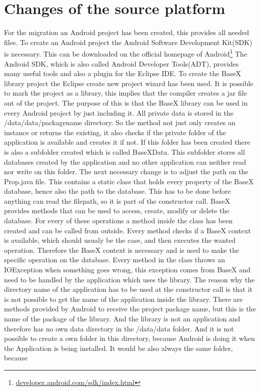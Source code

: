\section{Changes of the source platform}
\label{sec:migration:changes-of-the-source-platform}
For the migration an Android project has been created, this provides all needed files.
To create an Android project the Android Software Development Kit(SDK) is necessary.
This can be downloaded on the official homepage of Android\footnote{\url{developer.android.com/sdk/index.html}}
The Android SDK, which is also called Android Developer Tools(ADT), provides many useful tools and also a plugin for the Eclipse IDE.
To create the BaseX library project the Eclipse create new project wizard has been used.
It is possible to mark the project as a library, this implies that the compiler creates a jar file out of the project.
The purpose of this is that the BaseX library can be used in every Android project by just including it.
All private data is stored in the /data/data/packagename directory.
So the method not just only creates an instance or returns the existing, it also checks if the private folder of the application is available and creates it if not.
If this folder has been created there is also a subfolder created which is called BaseXData.
This subfolder stores all databases created by the application and no other application can neither read nor write on this folder.
The next necessary change is to adjust the path on the Prop.java file.
This contains a static class that holds every property of the BaseX database, hence also the path to the database.
This has to be done before anything can read the filepath, so it is part of the constructor call.
BaseX provides methods that can be used to access, create, modify or delete the database.
For every of these operations a method inside the class has been created and can be called from outside.
Every method checks if a BaseX context is available, which should usualy be the case, and then executes the wanted operation.
Therefore the BaseX context is necessary and is used to make the specific operation on the database.
Every method in the class throws an IOException when something goes wrong, this exception comes from BaseX and need to be handled by the application which uses the library.
The reason why the directory name of the application has to be used at the constructor call is that it is not possible to get the name of the application inside the library.
There are methods provided by Android to receive the project package name, but this is the name of the package of the library.
And the library is not an application and therefore has no own data directory in the /data/data folder.
And it is not possible to create a own folder in this directory, because Android is doing it when the Application is being installed.
It would be also always the same folder, because 



